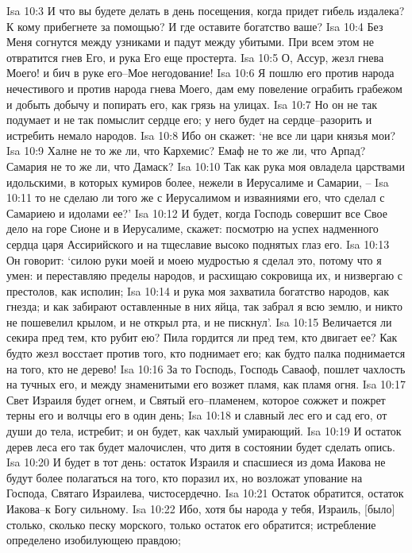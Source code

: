 Isa 10:3  И что вы будете делать в день посещения, когда придет гибель издалека? К кому прибегнете за помощью? И где оставите богатство ваше?
Isa 10:4  Без Меня согнутся между узниками и падут между убитыми. При всем этом не отвратится гнев Его, и рука Его еще простерта.
Isa 10:5  О, Ассур, жезл гнева Моего! и бич в руке его--Мое негодование!
Isa 10:6  Я пошлю его против народа нечестивого и против народа гнева Моего, дам ему повеление ограбить грабежом и добыть добычу и попирать его, как грязь на улицах.
Isa 10:7  Но он не так подумает и не так помыслит сердце его; у него будет на сердце--разорить и истребить немало народов.
Isa 10:8  Ибо он скажет: `не все ли цари князья мои?
Isa 10:9  Халне не то же ли, что Кархемис? Емаф не то же ли, что Арпад? Самария не то же ли, что Дамаск?
Isa 10:10  Так как рука моя овладела царствами идольскими, в которых кумиров более, нежели в Иерусалиме и Самарии, --
Isa 10:11  то не сделаю ли того же с Иерусалимом и изваяниями его, что сделал с Самариею и идолами ее?'
Isa 10:12  И будет, когда Господь совершит все Свое дело на горе Сионе и в Иерусалиме, скажет: посмотрю на успех надменного сердца царя Ассирийского и на тщеславие высоко поднятых глаз его.
Isa 10:13  Он говорит: `силою руки моей и моею мудростью я сделал это, потому что я умен: и переставляю пределы народов, и расхищаю сокровища их, и низвергаю с престолов, как исполин;
Isa 10:14  и рука моя захватила богатство народов, как гнезда; и как забирают оставленные в них яйца, так забрал я всю землю, и никто не пошевелил крылом, и не открыл рта, и не пискнул'.
Isa 10:15  Величается ли секира пред тем, кто рубит ею? Пила гордится ли пред тем, кто двигает ее? Как будто жезл восстает против того, кто поднимает его; как будто палка поднимается на того, кто не дерево!
Isa 10:16  За то Господь, Господь Саваоф, пошлет чахлость на тучных его, и между знаменитыми его возжет пламя, как пламя огня.
Isa 10:17  Свет Израиля будет огнем, и Святый его--пламенем, которое сожжет и пожрет терны его и волчцы его в один день;
Isa 10:18  и славный лес его и сад его, от души до тела, истребит; и он будет, как чахлый умирающий.
Isa 10:19  И остаток дерев леса его так будет малочислен, что дитя в состоянии будет сделать опись.
Isa 10:20  И будет в тот день: остаток Израиля и спасшиеся из дома Иакова не будут более полагаться на того, кто поразил их, но возложат упование на Господа, Святаго Израилева, чистосердечно.
Isa 10:21  Остаток обратится, остаток Иакова--к Богу сильному.
Isa 10:22  Ибо, хотя бы народа у тебя, Израиль, [было] столько, сколько песку морского, только остаток его обратится; истребление определено изобилующею правдою;

